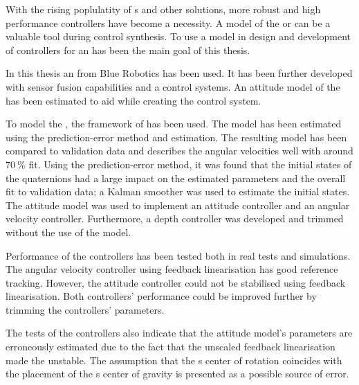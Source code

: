 With the rising poplulatity of \abbrROV{}s and other \abbrUV solutions, more robust and high performance controllers have become a necessity. A model of the \abbrROV or \abbrUV can be a valuable tool during control synthesis. To use a model in design and development of controllers for an \abbrROV has been the main goal of this thesis.

In this thesis an \abbrROV from Blue Robotics has been used. It has been further developed with sensor fusion capabilities and a control systems.     
An attitude model of the \abbrROV has been estimated to aid while creating the control system. 

To model the \abbrROV, the framework of \citet{fossen2011} has been used. The model has been estimated using the prediction-error method and \abbrEKF estimation. The resulting model has been compared to validation data and describes the angular velocities well with around $70\ \%$ fit. Using the prediction-error method, it was found that the initial states of the quaternions had a large impact on the estimated parameters and the overall fit to validation data; a Kalman smoother was used to estimate the initial states. The attitude model was used to implement an attitude controller and an angular velocity controller. Furthermore, a depth controller was developed and trimmed without the use of the model.  

Performance of the controllers has been tested both in real tests and simulations. The angular velocity controller using feedback linearisation has good reference tracking. However, the attitude controller could not be stabilised using feedback linearisation. Both controllers' performance could be improved further by trimming the controllers' parameters. 

The tests of the controllers also indicate that the attitude model's parameters are erroneously estimated due to the fact that the unscaled feedback linearisation made the \abbrROV unstable. The assumption that the \abbrROV{}s center of rotation coincides with the placement of the \abbrROV{}s center of gravity is presented as a possible source of error. 